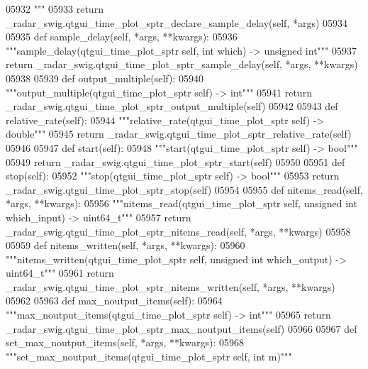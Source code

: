\begin{DoxyCode}
{{{{{{{{{{{{{{{{{{{{05932 \textcolor{stringliteral}{        """}
05933         \textcolor{keywordflow}{return} \_radar\_swig.qtgui\_time\_plot\_sptr\_declare\_sample\_delay(self, *args)
05934 
05935     \textcolor{keyword}{def }sample_delay(self, *args, **kwargs):
05936         \textcolor{stringliteral}{"""sample\_delay(qtgui\_time\_plot\_sptr self, int which) -> unsigned int"""}
05937         \textcolor{keywordflow}{return} \_radar\_swig.qtgui\_time\_plot\_sptr\_sample\_delay(self, *args, **kwargs)
05938 
05939     \textcolor{keyword}{def }output_multiple(self):
05940         \textcolor{stringliteral}{"""output\_multiple(qtgui\_time\_plot\_sptr self) -> int"""}
05941         \textcolor{keywordflow}{return} \_radar\_swig.qtgui\_time\_plot\_sptr\_output\_multiple(self)
05942 
05943     \textcolor{keyword}{def }relative_rate(self):
05944         \textcolor{stringliteral}{"""relative\_rate(qtgui\_time\_plot\_sptr self) -> double"""}
05945         \textcolor{keywordflow}{return} \_radar\_swig.qtgui\_time\_plot\_sptr\_relative\_rate(self)
05946 
05947     \textcolor{keyword}{def }start(self):
05948         \textcolor{stringliteral}{"""start(qtgui\_time\_plot\_sptr self) -> bool"""}
05949         \textcolor{keywordflow}{return} \_radar\_swig.qtgui\_time\_plot\_sptr\_start(self)
05950 
05951     \textcolor{keyword}{def }stop(self):
05952         \textcolor{stringliteral}{"""stop(qtgui\_time\_plot\_sptr self) -> bool"""}
05953         \textcolor{keywordflow}{return} \_radar\_swig.qtgui\_time\_plot\_sptr\_stop(self)
05954 
05955     \textcolor{keyword}{def }nitems_read(self, *args, **kwargs):
05956         \textcolor{stringliteral}{"""nitems\_read(qtgui\_time\_plot\_sptr self, unsigned int which\_input) -> uint64\_t"""}
05957         \textcolor{keywordflow}{return} \_radar\_swig.qtgui\_time\_plot\_sptr\_nitems\_read(self, *args, **kwargs)
05958 
05959     \textcolor{keyword}{def }nitems_written(self, *args, **kwargs):
05960         \textcolor{stringliteral}{"""nitems\_written(qtgui\_time\_plot\_sptr self, unsigned int which\_output) -> uint64\_t"""}
05961         \textcolor{keywordflow}{return} \_radar\_swig.qtgui\_time\_plot\_sptr\_nitems\_written(self, *args, **kwargs)
05962 
05963     \textcolor{keyword}{def }max_noutput_items(self):
05964         \textcolor{stringliteral}{"""max\_noutput\_items(qtgui\_time\_plot\_sptr self) -> int"""}
05965         \textcolor{keywordflow}{return} \_radar\_swig.qtgui\_time\_plot\_sptr\_max\_noutput\_items(self)
05966 
05967     \textcolor{keyword}{def }set_max_noutput_items(self, *args, **kwargs):
05968         \textcolor{stringliteral}{"""set\_max\_noutput\_items(qtgui\_time\_plot\_sptr self, int m)"""}
}}}}}}}}}}}}}}}}}}}}
\end{DoxyCode}
